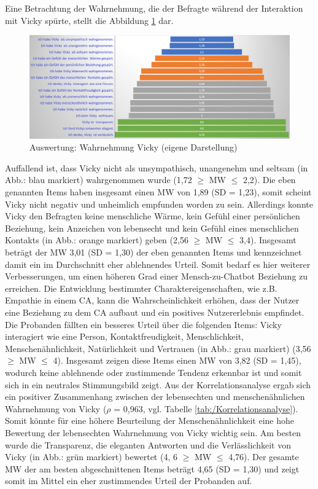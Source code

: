 Eine Betrachtung der Wahrnehmung, die der Befragte während der Interaktion mit Vicky spürte, stellt die Abbildung \ref{fig:Wahrnehmung_Vicky} dar.
  \begin{figure}[H]
    \centering
    \includegraphics[width=1\linewidth]{images/Auswertung/Wahrnehmung_Vicky.png}
   \caption[Auswertung: Wahrnehmung Vicky] {Auswertung: Wahrnehmung Vicky (eigene Darstellung)}
  \label{fig:Wahrnehmung_Vicky}
  \end{figure} 

Auffallend ist, dass Vicky nicht als unsympathisch, unangenehm und seltsam (in Abb.: blau markiert) wahrgenommen wurde (1,72 $\geq$ MW $\leq$ 2,2).
Die eben genannten Items haben insgesamt einen MW von 1,89 (SD = 1,23), somit scheint Vicky nicht negativ und unheimlich empfunden worden zu sein.
Allerdings konnte Vicky den Befragten keine menschliche Wärme, kein Gefühl einer persönlichen Beziehung, kein Anzeichen von lebensecht und kein 
Gefühl eines menschlichen Kontakts (in Abb.: orange markiert) geben (2,56 $\geq$ MW $\leq$ 3,4).
Insgesamt beträgt der MW 3,01 (SD = 1,30) der eben genannten Items und kennzeichnet damit ein im Durchschnitt eher ablehnendes Urteil.
Somit bedarf es hier weiterer Verbesserungen, um einen höheren Grad einer Mensch-zu-Chatbot Beziehung zu erreichen.
Die Entwicklung bestimmter Charaktereigenschaften, wie z.B. Empathie in einem CA, kann
die Wahrscheinlichkeit erhöhen, dass der Nutzer eine Beziehung zu dem CA aufbaut und ein
positives Nutzererlebnis empfindet. \parencite[289 ff.]{Bickmore.2010} \parencite[7 ff.]{Fitzpatrick.2017}
Die Probanden fällten ein besseres Urteil über die folgenden Items: Vicky interagiert wie eine Person, Kontaktfreudigkeit, Menschlichkeit, Menschenähnlichkeit,
Natürlichkeit und Vertrauen (in Abb.: grau markiert) (3,56 $\geq$ MW $\leq$ 4).
Insgesamt zeigen diese Items einen MW von 3,82 (SD = 1,45), wodurch keine ablehnende oder zustimmende Tendenz erkennbar ist 
und somit sich in ein neutrales Stimmungsbild zeigt.
Aus der Korrelationsanalyse ergab sich ein positiver Zusammenhang zwischen der lebensechten und menschenähnlichen Wahrnehmung von Vicky ($\rho$ = 0,963, vgl. Tabelle \ref{tab:/Korrelationsanalyse}).
Somit könnte für eine höhere Beurteilung der Menschenähnlichkeit eine hohe Bewertung der lebensechten Wahrnehmung von Vicky wichtig sein.
Am besten wurde die Transparenz, die eleganten Antworten und die Verlässlichkeit von Vicky (in Abb.: grün markiert) bewertet (4, 6 $\geq$ MW $\leq$ 4,76).
Der gesamte MW der am besten abgeschnittenen Items beträgt 4,65 (SD = 1,30) und zeigt somit im Mittel ein eher zustimmendes Urteil der Probanden auf.

